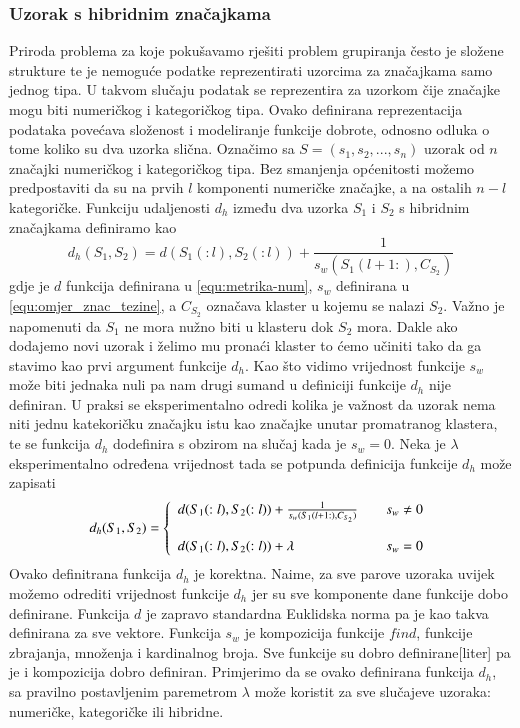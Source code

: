 \documentclass[a4paper,twoside,12pt]{memoir} %
\begin{document}
\subsubsection{Uzorak s hibridnim značajkama}
Priroda problema za koje pokušavamo rješiti problem grupiranja često je složene strukture te je nemoguće podatke reprezentirati uzorcima za značajkama samo jednog tipa. U takvom slučaju podatak se reprezentira za uzorkom čije značajke mogu biti numeričkog i kategoričkog tipa. Ovako definirana reprezentacija podataka povećava složenost i modeliranje funkcije dobrote, odnosno odluka o tome koliko su dva uzorka slična.
Označimo sa $S = (s_1,s_2,...,s_n)$ uzorak od $n$ značajki numeričkog i kategoričkog tipa. Bez smanjenja općenitosti možemo predpostaviti da su na prvih $l$ komponenti numeričke značajke, a na ostalih $n-l$ kategoričke. Funkciju udaljenosti $d_h$ između dva uzorka $S_1 $ i $S_2$ s hibridnim značajkama definiramo kao
\begin{equation}
d_h(S_1, S_2) = d(S_1(:l),S_2(:l)) + \frac{1}{s_w(S_1(l+1:),C_{S_2})}
\end{equation}
gdje je $d$ funkcija definirana u \ref{equ:metrika-num}, $s_w$ definirana u \ref{equ:omjer_znac_tezine}, a $C_{S_2}$ označava klaster u kojemu se nalazi $S_2$. Važno je napomenuti da $S_1$ ne mora nužno biti u klasteru dok $S_2$ mora. Dakle ako dodajemo novi uzorak i želimo mu pronaći klaster to ćemo učiniti tako da ga stavimo kao prvi argument funkcije $d_h$. Kao što vidimo vrijednost funkcije $s_w$ može biti jednaka nuli pa nam drugi sumand u definiciji funkcije $d_h$ nije definiran. U praksi se eksperimentalno odredi kolika je važnost da uzorak nema niti jednu katekoričku značajku istu kao značajke unutar promatranog klastera, te se funkcija $d_h$ dodefinira s obzirom na slučaj kada je $s_w = 0$. Neka je $\lambda$ eksperimentalno određena vrijednost tada se potpunda definicija funkcije $d_h$ može zapisati 
\begin{equation}
d_h(S_1,S_2) = \left\{ 
  \begin{array}{l l}
    d(S_1(:l),S_2(:l)) + \frac{1}{s_w(S_1(l+1:),C_{S_2})} & \quad s_w \neq 0\\
    \\
    d(S_1(:l),S_2(:l)) + \lambda & \quad s_w=0
  \end{array} \right.
\end{equation}
Ovako definitrana funkcija $d_h$ je korektna. Naime, za sve parove uzoraka uvijek možemo odrediti vrijednost funkcije $d_h$ jer su sve komponente dane funkcije dobo definirane. Funkcija $d$ je zapravo standardna Euklidska norma pa je kao takva definirana za sve vektore. Funkcija $s_w$ je kompozicija funkcije $find$, funkcije zbrajanja, množenja i kardinalnog broja. Sve funkcije su dobro definirane[liter] pa je i kompozicija dobro definiran. Primjerimo da se ovako definirana funkcija $d_h$, sa pravilno postavljenim paremetrom $\lambda$ može koristit za sve slučajeve uzoraka: numeričke, kategoričke ili hibridne.
\end{document}
